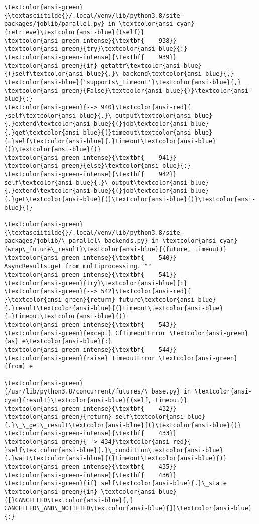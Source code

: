\documentclass[11pt]{article}
\begin{document}
\begin{Verbatim}[commandchars=\\\{\}, frame=single, framerule=2mm, rulecolor=\color{outerrorbackground}]
\textcolor{ansi-green}{\textasciitilde{}/.local/venv/lib/python3.8/site-packages/joblib/parallel.py} in \textcolor{ansi-cyan}{retrieve}\textcolor{ansi-blue}{(self)}
\textcolor{ansi-green-intense}{\textbf{    938}}             \textcolor{ansi-green}{try}\textcolor{ansi-blue}{:}
\textcolor{ansi-green-intense}{\textbf{    939}}                 \textcolor{ansi-green}{if} getattr\textcolor{ansi-blue}{(}self\textcolor{ansi-blue}{.}\_backend\textcolor{ansi-blue}{,} \textcolor{ansi-blue}{'supports\_timeout'}\textcolor{ansi-blue}{,} \textcolor{ansi-green}{False}\textcolor{ansi-blue}{)}\textcolor{ansi-blue}{:}
\textcolor{ansi-green}{--> 940}\textcolor{ansi-red}{                     }self\textcolor{ansi-blue}{.}\_output\textcolor{ansi-blue}{.}extend\textcolor{ansi-blue}{(}job\textcolor{ansi-blue}{.}get\textcolor{ansi-blue}{(}timeout\textcolor{ansi-blue}{=}self\textcolor{ansi-blue}{.}timeout\textcolor{ansi-blue}{)}\textcolor{ansi-blue}{)}
\textcolor{ansi-green-intense}{\textbf{    941}}                 \textcolor{ansi-green}{else}\textcolor{ansi-blue}{:}
\textcolor{ansi-green-intense}{\textbf{    942}}                     self\textcolor{ansi-blue}{.}\_output\textcolor{ansi-blue}{.}extend\textcolor{ansi-blue}{(}job\textcolor{ansi-blue}{.}get\textcolor{ansi-blue}{(}\textcolor{ansi-blue}{)}\textcolor{ansi-blue}{)}

\textcolor{ansi-green}{\textasciitilde{}/.local/venv/lib/python3.8/site-packages/joblib/\_parallel\_backends.py} in \textcolor{ansi-cyan}{wrap\_future\_result}\textcolor{ansi-blue}{(future, timeout)}
\textcolor{ansi-green-intense}{\textbf{    540}}         AsyncResults.get from multiprocessing."""
\textcolor{ansi-green-intense}{\textbf{    541}}         \textcolor{ansi-green}{try}\textcolor{ansi-blue}{:}
\textcolor{ansi-green}{--> 542}\textcolor{ansi-red}{             }\textcolor{ansi-green}{return} future\textcolor{ansi-blue}{.}result\textcolor{ansi-blue}{(}timeout\textcolor{ansi-blue}{=}timeout\textcolor{ansi-blue}{)}
\textcolor{ansi-green-intense}{\textbf{    543}}         \textcolor{ansi-green}{except} CfTimeoutError \textcolor{ansi-green}{as} e\textcolor{ansi-blue}{:}
\textcolor{ansi-green-intense}{\textbf{    544}}             \textcolor{ansi-green}{raise} TimeoutError \textcolor{ansi-green}{from} e

\textcolor{ansi-green}{/usr/lib/python3.8/concurrent/futures/\_base.py} in \textcolor{ansi-cyan}{result}\textcolor{ansi-blue}{(self, timeout)}
\textcolor{ansi-green-intense}{\textbf{    432}}                 \textcolor{ansi-green}{return} self\textcolor{ansi-blue}{.}\_\_get\_result\textcolor{ansi-blue}{(}\textcolor{ansi-blue}{)}
\textcolor{ansi-green-intense}{\textbf{    433}} 
\textcolor{ansi-green}{--> 434}\textcolor{ansi-red}{             }self\textcolor{ansi-blue}{.}\_condition\textcolor{ansi-blue}{.}wait\textcolor{ansi-blue}{(}timeout\textcolor{ansi-blue}{)}
\textcolor{ansi-green-intense}{\textbf{    435}} 
\textcolor{ansi-green-intense}{\textbf{    436}}             \textcolor{ansi-green}{if} self\textcolor{ansi-blue}{.}\_state \textcolor{ansi-green}{in} \textcolor{ansi-blue}{[}CANCELLED\textcolor{ansi-blue}{,} CANCELLED\_AND\_NOTIFIED\textcolor{ansi-blue}{]}\textcolor{ansi-blue}{:}


\end{Verbatim}
\end{document}

